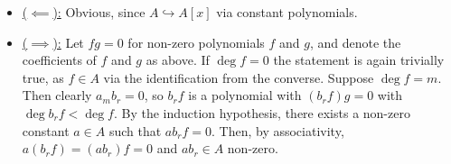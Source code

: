 \documentclass[a4paper, 12pt]{article}
\begin{document}
\begin{Exercise}
\begin{enumerate}[label=(\alph*)]
            \begin{itemize}
                \item \underline{($\impliedby$):}
                    Obvious, since $A \hookrightarrow A[x]$ via constant polynomials.
                \item \underline{($\implies$):}
                    Let $fg = 0$ for non-zero polynomials $f$ and $g$, and denote the coefficients of $f$ and $g$ as above.
                    If $\deg f = 0$ the statement is again trivially true, as $f \in A$ via the identification from the converse.
                    Suppose $\deg f = m$.
                    Then clearly $a_mb_r = 0$, so $b_rf$ is a polynomial with $(b_rf)g = 0$ with $\deg b_rf < \deg f$.
                    By the induction hypothesis, there exists a non-zero constant $a \in A$ such that $ab_rf = 0$.
                    Then, by associativity, $a(b_rf) = (ab_r)f = 0$ and $a b_r \in A$ non-zero.
            \end{itemize}
    \end{enumerate}
\end{Exercise}
\end{document}
